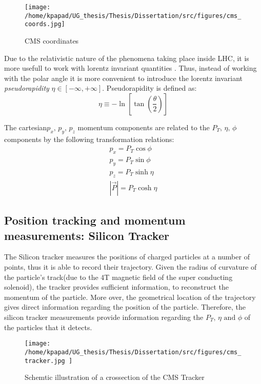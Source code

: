 \begin{figure}[h]
\centering
\texttt{[image: /home/kpapad/UG\_thesis/Thesis/Dissertation/src/figures/cms\_coords.jpg]}
\caption{CMS coordinates}
\label{fig:CMSCoords}
\end{figure}


Due to the relativistic nature of the phenomena taking place inside LHC, it is more usefull to work with lorentz invariant quantities \cite{AcceleratorsLecture}. Thus, instead of working with the polar angle it is more convenient to introduce the lorentz invariant  \emph{pseudorapidity} \(\eta\in \left [ -\infty, +\infty \right ]\).  Pseudorapidity is defined as:
\begin{equation}
\eta \equiv -\ln{\left [ \tan\left (\frac{\theta}{2} \right ) \right]  }
\end{equation}

The cartesian\(p_{x}\text{, } p_{y}\text{, }p_{z}\) momentum components are related to the \(P_{T}\text{, }\eta\text{, }\phi\)  components by the following transformation relations:
\begin{equation}
\begin{matrix}
p_{x} = P_{T}\cos{\phi} \\
p_{y} = P_{T}\sin{\phi} \\
p_{z} = P_{T}\sinh{\eta}\\
|\vec{P}| = P_{T}\cosh{\eta} 
\end{matrix}
\end{equation}

\subsection{Position tracking and momentum measurements: Silicon Tracker}
\label{sec:org2c477d8}
The Silicon tracker measures the positions of charged particles at a number of points, thus it is able to record their trajectory. Given the radius of curvature of the particle's track(due to the 4T magnetic field of the super conducting solenoid), the tracker provides sufficient information, to reconstruct the momentum of the particle. More over, the geometrical location of the trajectory gives direct information regarding the position of the particle. Therefore, the silicon tracker measurements  provide  information regarding the \(P_{T}\text{, } \eta\text{ and }\phi\) of the particles that it detects.

\begin{figure}[h]
\centering
\texttt{[image: /home/kpapad/UG\_thesis/Thesis/Dissertation/src/figures/cms\_tracker.jpg ]}
\caption{Schemtic illustration of a crossection of the CMS Tracker }
\label{fig:si_tracker}
\end{figure}


